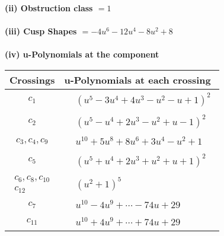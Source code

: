 \documentclass[1p]{elsarticle_modified}
\theoremstyle{definition}
\begin{document}
\flushleft \textbf{(ii) Obstruction class $= 1$}\\~\\
\flushleft \textbf{(iii) Cusp Shapes $= -4 u^6-12 u^4-8 u^2+8$}\\~\\
\newpage\renewcommand{\arraystretch}{1}
\flushleft \textbf{(iv) u-Polynomials at the component}\newline \\
\begin{tabular}{m{50pt}|m{274pt}}
Crossings & \hspace{64pt}u-Polynomials at each crossing \\
\hline $$\begin{aligned}c_{1}\end{aligned}$$&$\begin{aligned}
&(u^5-3 u^4+4 u^3- u^2- u+1)^2
\end{aligned}$\\
\hline $$\begin{aligned}c_{2}\end{aligned}$$&$\begin{aligned}
&(u^5- u^4+2 u^3- u^2+u-1)^2
\end{aligned}$\\
\hline $$\begin{aligned}c_{3},c_{4},c_{9}\end{aligned}$$&$\begin{aligned}
&u^{10}+5 u^8+8 u^6+3 u^4- u^2+1
\end{aligned}$\\
\hline $$\begin{aligned}c_{5}\end{aligned}$$&$\begin{aligned}
&(u^5+u^4+2 u^3+u^2+u+1)^2
\end{aligned}$\\
\hline $$\begin{aligned}c_{6},c_{8},c_{10}\\c_{12}\end{aligned}$$&$\begin{aligned}
&(u^2+1)^5
\end{aligned}$\\
\hline $$\begin{aligned}c_{7}\end{aligned}$$&$\begin{aligned}
&u^{10}-4 u^9+\cdots-74 u+29
\end{aligned}$\\
\hline $$\begin{aligned}c_{11}\end{aligned}$$&$\begin{aligned}
&u^{10}+4 u^9+\cdots+74 u+29
\end{aligned}$\\
\hline
\end{tabular}\\~\\
\end{document}
